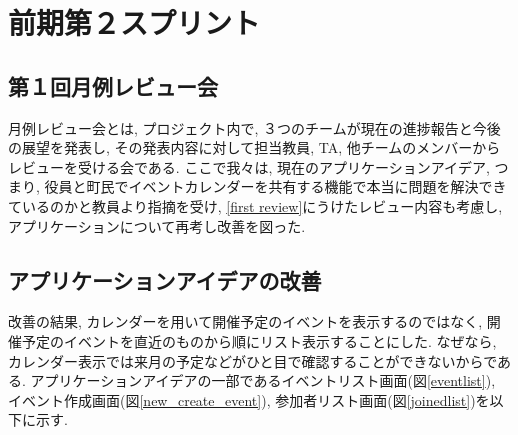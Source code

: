 \section{前期第２スプリント}

\subsection{第１回月例レビュー会}
月例レビュー会とは, プロジェクト内で, ３つのチームが現在の進捗報告と今後の展望を発表し, その発表内容に対して担当教員, TA, 他チームのメンバーからレビューを受ける会である.
ここで我々は, 現在のアプリケーションアイデア, つまり, 役員と町民でイベントカレンダーを共有する機能で本当に問題を解決できているのかと教員より指摘を受け,
\ref{first review}にうけたレビュー内容も考慮し, アプリケーションについて再考し改善を図った.


\subsection{アプリケーションアイデアの改善}
改善の結果, カレンダーを用いて開催予定のイベントを表示するのではなく,
開催予定のイベントを直近のものから順にリスト表示することにした.
なぜなら, カレンダー表示では来月の予定などがひと目で確認することができないからである.
アプリケーションアイデアの一部であるイベントリスト画面(図\ref{eventlist}),
イベント作成画面(図\ref{new_create_event}), 参加者リスト画面(図\ref{joinedlist})を以下に示す.

